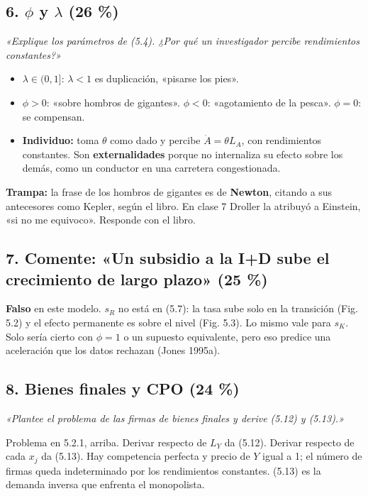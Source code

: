 \documentclass[11pt,a4paper]{article}
\begin{document}
\subsection*{6. $\phi$ y $\lambda$ (26 \%)}

\emph{«Explique los parámetros de (5.4). ¿Por qué un investigador percibe rendimientos constantes?»}

\begin{itemize}[leftmargin=*,itemsep=2pt,topsep=2pt]
\item $\lambda \in (0,1]$: $\lambda < 1$ es duplicación, «pisarse los pies».
\item $\phi > 0$: «sobre hombros de gigantes». $\phi < 0$: «agotamiento de la pesca». $\phi = 0$: se compensan.
\item \textbf{Individuo:} toma $\theta$ como dado y percibe $\dot A = \theta L_A$, con rendimientos constantes. Son \textbf{externalidades} porque no internaliza su efecto sobre los demás, como un conductor en una carretera congestionada.
\end{itemize}

\textbf{Trampa:} la frase de los hombros de gigantes es de \textbf{Newton}, citando a sus antecesores como Kepler, según el libro. En clase 7 Droller la atribuyó a Einstein, «si no me equivoco». Responde con el libro.

\subsection*{7. Comente: «Un subsidio a la I+D sube el crecimiento de largo plazo» (25 \%)}

\textbf{Falso} en este modelo. $s_R$ no está en (5.7): la tasa sube solo en la transición (Fig. 5.2) y el efecto permanente es sobre el nivel (Fig. 5.3). Lo mismo vale para $s_K$. Solo sería cierto con $\phi = 1$ o un supuesto equivalente, pero eso predice una aceleración que los datos rechazan (Jones 1995a).

\subsection*{8. Bienes finales y CPO (24 \%)}

\emph{«Plantee el problema de las firmas de bienes finales y derive (5.12) y (5.13).»}

Problema en 5.2.1, arriba. Derivar respecto de $L_Y$ da (5.12). Derivar respecto de cada $x_j$ da (5.13). Hay competencia perfecta y precio de $Y$ igual a 1; el número de firmas queda indeterminado por los rendimientos constantes. (5.13) es la demanda inversa que enfrenta el monopolista.
\end{document}
